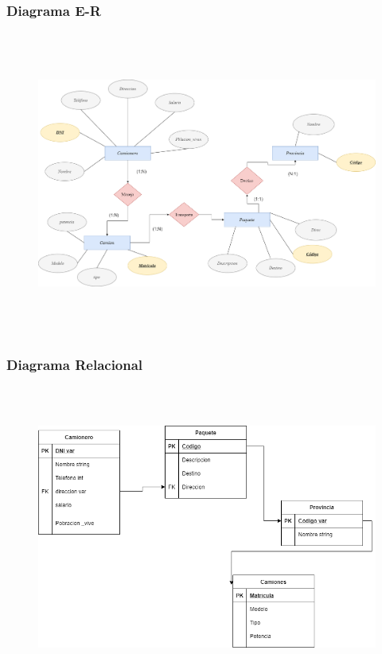 \documentclass[a4paper, 12pt]{article}
\begin{document}
\begin{justify}
        \subsubsection{Diagrama E-R}
        \begin{figure}[H]
            \centering
            \includegraphics[width=16cm,height=10cm]{er2.png}
        \end{figure}
        \subsubsection{Diagrama Relacional}
        \begin{figure}[H]
            \centering
            \includegraphics[width=16cm,height=10cm]{rel2.png}
        \end{figure}

\end{justify}
\end{document}
